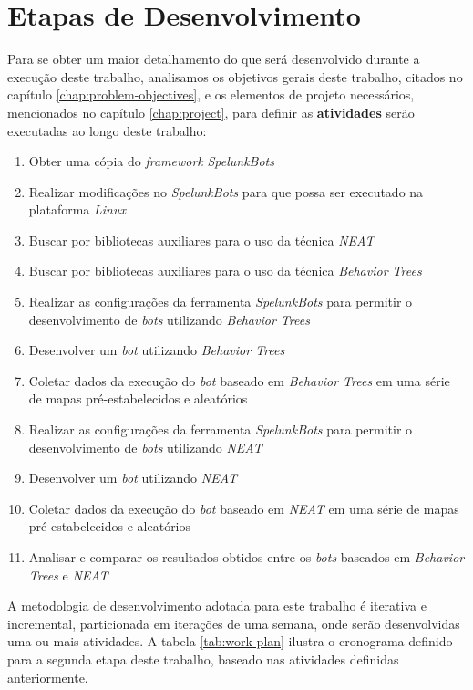 \chapter{\label{chap:work-plan}Etapas de Desenvolvimento}
Para se obter um maior detalhamento do que será desenvolvido durante a execução
deste trabalho, analisamos os objetivos gerais deste trabalho, citados no
capítulo \ref{chap:problem-objectives}, e os elementos de projeto necessários,
mencionados no capítulo \ref{chap:project}, para definir as \textbf{atividades}
serão executadas ao longo deste trabalho:

\begin{enumerate}
	\item
		Obter uma cópia do \textit{framework} \textit{SpelunkBots}
	\item
		Realizar modificações no \textit{SpelunkBots} para que possa ser
		executado na plataforma \textit{Linux}
	\item
		Buscar por bibliotecas auxiliares para o uso da técnica \textit{NEAT}
	\item
		Buscar por bibliotecas auxiliares para o uso da técnica \textit{Behavior
		Trees}
	\item
		Realizar as configurações da ferramenta \textit{SpelunkBots} para
		permitir o desenvolvimento de \textit{bots} utilizando \textit{Behavior
		Trees}
	\item
		Desenvolver um \textit{bot} utilizando \textit{Behavior Trees}
	\item
		Coletar dados da execução do \textit{bot} baseado em \textit{Behavior
		Trees} em uma série de mapas pré-estabelecidos e aleatórios
	\item
		Realizar as configurações da ferramenta \textit{SpelunkBots} para
		permitir o desenvolvimento de \textit{bots} utilizando \textit{NEAT}
	\item
		Desenvolver um \textit{bot} utilizando \textit{NEAT}
	\item
		Coletar dados da execução do \textit{bot} baseado em \textit{NEAT} em
		uma série de mapas pré-estabelecidos e aleatórios
	\item
		Analisar e comparar os resultados obtidos entre os \textit{bots}
		baseados em \textit{Behavior Trees} e \textit{NEAT}
\end{enumerate}

A metodologia de desenvolvimento adotada para este trabalho é iterativa e
incremental, particionada em iterações de uma semana, onde serão desenvolvidas
uma ou mais atividades. A tabela \ref{tab:work-plan} ilustra o cronograma
definido para a segunda etapa deste trabalho, baseado nas atividades definidas
anteriormente.

